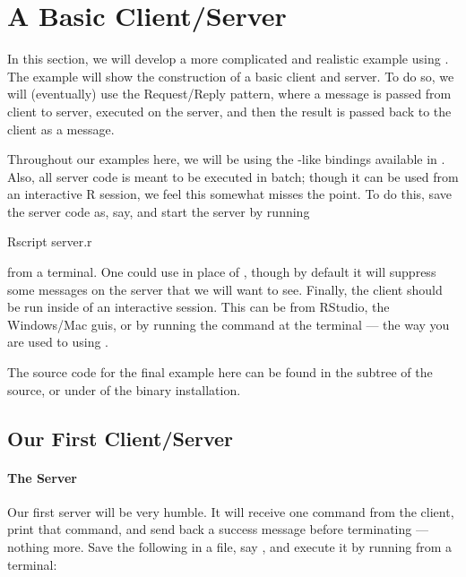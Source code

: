 \section[A Basic Client/Server]{A Basic Client/Server}
\label{sec:backward}


In this section, we will develop a more complicated and realistic example using
.  The example will show the construction of a basic client and
server.  To do so, we will (eventually) use the Request/Reply pattern, where a
message is passed from client to server, executed on the server, and then the
result is passed back to the client as a message.

Throughout our examples here, we will be using the -like bindings 
available in .  Also, all server code is meant to be executed in
batch; though it can be used from an interactive R session, we feel this
somewhat misses the point.  To do this, save the server code as, say,
 and start the server by running
\begin{Command}
Rscript server.r
\end{Command}
from a terminal.  One could use  in place of , 
though by default it will suppress some messages on the server that we will 
want to see.  Finally, the client should be run inside of an interactive
 session.  This can be from RStudio, the Windows/Mac 
guis, or by running the command  at the terminal --- the way you are
used to using .

The source code for the final example here can be found in the 
 subtree of the  source, or under
 of the binary installation.


\subsection{Our First Client/Server}

\paragraph{The Server}
Our first server will be very humble.  It will receive one command from the
client, print that command, and send back a success message before terminating
--- nothing  more.  Save the following in a file, say , and
execute it by running  from a terminal:


